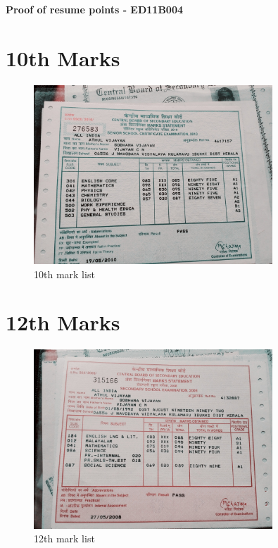 \documentclass[11pt]{article}
\newcommand*{\titleGM}{\begingroup %
\hbox{ %
\hspace*{0.20.8\textwidth} %
\rule{1pt}{\textheight} %
\hspace*{0.050.8\textwidth} %
\parbox[b]{0.750.8\textwidth}{ %

{\noindent\Huge\bfseries  Neural data analysis}\\[2\baselineskip] %
{\large \textit{Notes}}\\[4\baselineskip] %
{\Large \textsc{Athul Vijayan \hspace{5pt} ed11b004}} %

\vspace{0.5\textheight} %
}}
\endgroup}
\begin{document}
\tableofcontents

\newpage
{\Large \textbf{Proof of resume points - ED11B004}
\FloatBarrier
\section{10th Marks}
\begin{figure}[h]
\centering
\includegraphics[width=0.8\textwidth]{10m.jpg}
\caption{10th mark list}
\label{gauss}
\end{figure}
\FloatBarrier
\section{12th Marks}
\begin{figure}[h]
\centering
\includegraphics[width=0.8\textwidth]{12m.jpg}
\caption{12th mark list}
\label{gauss}
\end{figure}
\FloatBarrier
}
\end{document}
